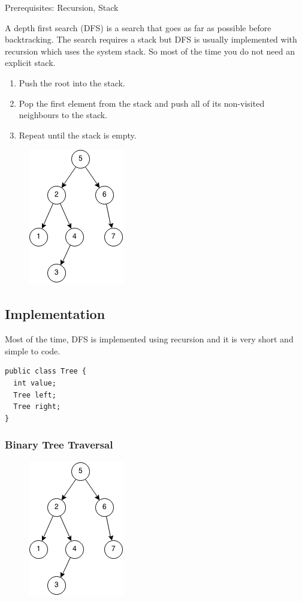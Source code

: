 \documentclass[11pt,oneside]{book}
\makeatletter
\def\maxwidth#1{\ifdim\Gin@nat@width>#1 #1\else\Gin@nat@width\fi}
\makeatother
\begin{document}
Prerequisites: Recursion, Stack

A depth first search (DFS) is a search that goes as far as possible before backtracking. The search requires a stack but DFS is usually implemented with recursion which uses the system stack. So most of the time you do not need an explicit stack.

\begin{enumerate}
\item Push the root into the stack.
\item Pop the first element from the stack and push all of its non-visited neighbours to the stack.
\item Repeat until the stack is empty.
\end{enumerate}

\vspace{5px}\begin{figure}[H]\centering
        \includegraphics[width=0.66\maxwidth{\textwidth}]{dfs.png}
        \end{figure}

\subsection{Implementation}

Most of the time, DFS is implemented using recursion and it is very short and simple to code.

\begin{lstlisting}
public class Tree {
  int value;
  Tree left;
  Tree right;
}
\end{lstlisting}

\subsubsection{Binary Tree Traversal}

\vspace{5px}\begin{figure}[H]\centering
        \includegraphics[width=0.66\maxwidth{\textwidth}]{dfs.png}
        \end{figure}
\end{document}
